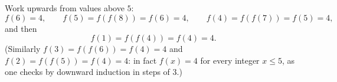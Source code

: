 Work upwards from values above $5$:
\[
f(6)=4,\qquad f(5)=f(f(8))=f(6)=4,\qquad f(4)=f(f(7))=f(5)=4,
\]
and then
\[
f(1)=f(f(4))=f(4)=\boxed{4}.
\]
(Similarly $f(3)=f(f(6))=f(4)=4$ and $f(2)=f(f(5))=f(4)=4$: in fact $f(x)=4$ for every integer $x\le5$, as one checks by downward induction in steps of $3$.)
